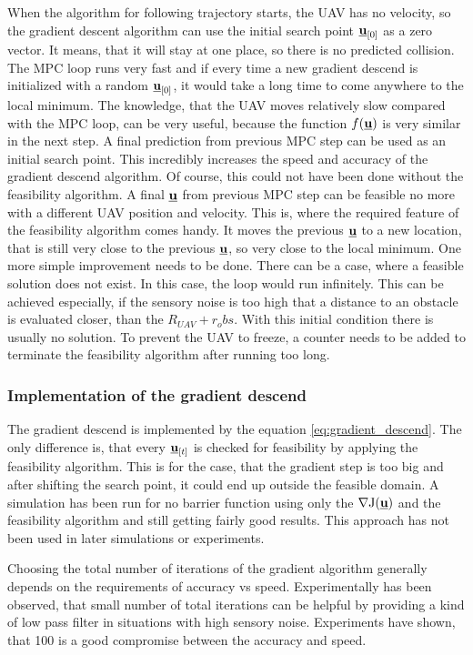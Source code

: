 \documentclass[a4paper,11pt,titlepage]{article}
\newcommand{\uvec}{\textbf{\underline{u}}}
\newcommand{\macJ}{\mathrm{J}(\uvec)}
\newcommand{\macf}{f(\uvec)}
\begin{document}
When the algorithm for following trajectory starts, the UAV has no velocity, so the gradient descent algorithm can use the initial search point $\uvec_{[0]}$ as a zero vector. It means, that it will stay at one place, so there is no predicted collision. The MPC loop runs very fast and if every time a new gradient descend is initialized with a random $\uvec_{[0]}$, it would take a long time to come anywhere to the local minimum. The knowledge, that the UAV moves relatively slow compared with the MPC loop, can be very useful, because the function $\macf$ is very similar in the next step. A final prediction from previous MPC step can be used as an initial search point. This incredibly increases the speed and accuracy of the gradient descend algorithm. Of course, this could not have been done without the feasibility algorithm. A final $\uvec$ from previous MPC step can be feasible no more with a different UAV position and velocity. This is, where the required feature of the feasibility algorithm comes handy. It moves the previous $\uvec$ to a new location, that is still very close to the previous $\uvec$, so very close to the local minimum. 
One more simple improvement needs to be done. There can be a case, where a feasible solution does not exist. In this case, the loop would run infinitely. This can be achieved especially, if the sensory noise is too high that a distance to an obstacle is evaluated closer, than the $R_{UAV} + r_obs$. With this initial condition there is usually no solution. To prevent the UAV to freeze, a counter needs to be added to terminate the feasibility algorithm after running too long.

\subsubsection{Implementation of the gradient descend}

The gradient descend is implemented by the equation \ref{eq:gradient_descend}. The only difference is, that every $\uvec_{[t]}$ is checked for feasibility by applying the feasibility algorithm. This is for the case, that the gradient step is too big and after shifting the search point, it could end up outside the feasible domain. A simulation has been run for no barrier function using only the $\nabla \macJ$ and the feasibility algorithm and still getting fairly good results. This approach has not been used in later simulations or experiments.

Choosing the total number of iterations of the gradient algorithm generally depends on the requirements of accuracy vs speed. Experimentally has been observed, that small number of total iterations can be helpful by providing a kind of low pass filter in situations with high sensory noise. Experiments have shown, that 100 is a good compromise between the accuracy and speed.
\end{document}
